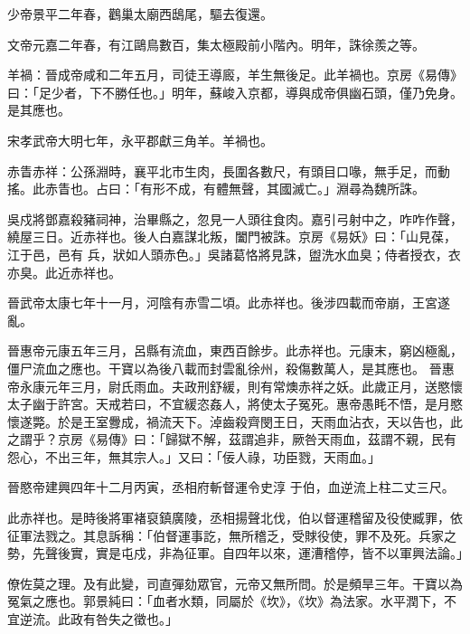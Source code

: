\begin{pinyinscope}
 少帝景平二年春，鸛巢太廟西鴟尾，驅去復還。



 文帝元嘉二年春，有江鷗鳥數百，集太極殿前小階內。明年，誅徐羨之等。



 羊禍：晉成帝咸和二年五月，司徒王導廄，羊生無後足。此羊禍也。京房《易傳》曰：「足少者，下不勝任也。」明年，蘇峻入京都，導與成帝俱幽石頭，僅乃免身。是其應也。



 宋孝武帝大明七年，永平郡獻三角羊。羊禍也。



 赤眚赤祥：公孫淵時，襄平北市生肉，長圍各數尺，有頭目口喙，無手足，而動搖。此赤眚也。占曰：「有形不成，有體無聲，其國滅亡。」淵尋為魏所誅。



 吳戍將鄧嘉殺豬祠神，治畢縣之，忽見一人頭往食肉。嘉引弓射中之，咋咋作聲，繞屋三日。近赤祥也。後人白嘉謀北叛，闔門被誅。京房《易妖》曰：「山見葆，江于邑，邑有
 兵，狀如人頭赤色。」吳諸葛恪將見誅，盥洗水血臭；侍者授衣，衣亦臭。此近赤祥也。



 晉武帝太康七年十一月，河陰有赤雪二頃。此赤祥也。後涉四載而帝崩，王宮遂亂。



 晉惠帝元康五年三月，呂縣有流血，東西百餘步。此赤祥也。元康末，窮凶極亂，僵尸流血之應也。干寶以為後八載而封雲亂徐州，殺傷數萬人，是其應也。
 晉惠帝永康元年三月，尉氏雨血。夫政刑舒緩，則有常燠赤祥之妖。此歲正月，送愍懷太子幽于許宮。天戒若曰，不宜緩恣姦人，將使太子冤死。惠帝愚眊不悟，是月愍懷遂斃。於是王室釁成，禍流天下。淖齒殺齊閔王日，天雨血沾衣，天以告也，此之謂乎？京房《易傳》曰：「歸獄不解，茲謂追非，厥咎天雨血，茲謂不親，民有怨心，不出三年，無其宗人。」又曰：「佞人祿，功臣戮，天雨血。」



 晉愍帝建興四年十二月丙寅，丞相府斬督運令史淳
 于伯，血逆流上柱二丈三尺。



 此赤祥也。是時後將軍褚裒鎮廣陵，丞相揚聲北伐，伯以督運稽留及役使臧罪，依征軍法戮之。其息訴稱：「伯督運事訖，無所稽乏，受賕役使，罪不及死。兵家之勢，先聲後實，實是屯戍，非為征軍。自四年以來，運漕稽停，皆不以軍興法論。」



 僚佐莫之理。及有此變，司直彈劾眾官，元帝又無所問。於是頻旱三年。干寶以為冤氣之應也。郭景純曰：「血者水類，同屬於《坎》，《坎》為法家。水平潤下，不宜逆流。此政有咎失之徵也。」



\end{pinyinscope}